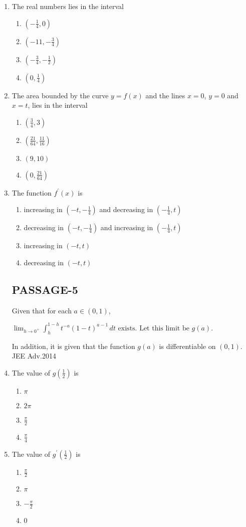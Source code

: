 \documentclass[journal,12pt,onecolumn]{IEEEtran}
\theoremstyle{remark}
\begin{document}
\begin{enumerate}
\item The real numbers lies in the interval
\begin{enumerate}
    \item $(-\frac{1}{4},0)$
    \item $(-11,-\frac{3}{4})$
    \item $(-\frac{3}{4},-\frac{1}{2})$
     \item $(0,\frac{1}{4})$
\end{enumerate}
\item The area bounded by the curve $y=f(x)$ and the lines $x=0$, $y=0$ 
 and $x=t$, lies in the interval
\begin{enumerate}
\item $(\frac{3}{4},3)$ 
\item $(\frac{21}{64},\frac{11}{16})$ 
\item $(9,10)$  
\item $(0,\frac{21}{64})$ 
\end{enumerate}
\item The function $f^{\prime}(x)$ is
\begin{enumerate}
    \item increasing in $(-t,-\frac{1}{4})$ and decreasing in $(-\frac{1}{4},t)$ 
    \item decreasing in $(-t,-\frac{1}{4})$ and increasing in $(-\frac{1}{4},t)$ 
    \item increasing in $(-t,t)$ 
    \item decreasing in $(-t,t)$
\end{enumerate}
\subsection{PASSAGE-5}

Given that for each $a \in (0, 1)$,

$\lim_{h \to 0^+} \int_h^{1-h} t^{-a} (1-t)^{a-1} \, dt \text{ exists. Let this limit be } g(a).$

In addition, it is given that the function $g(a)$ is differentiable on $(0, 1)$. 
\hfill{JEE Adv.2014} 
    \item The value of $g(\frac{1}{2})$ is
    \begin{enumerate}
        \item $\pi$
        \item $2\pi$
        \item $\frac{\pi}{2}$
        \item $\frac{\pi}{4}$
    \end{enumerate}
    \item The value of $g^{\prime}(\frac{1}{2})$ is
    \begin{enumerate}
        \item$\frac{\pi}{2}$
        \item${\pi} $
        \item $-\frac{\pi}{2}$
        \item 0
\end{enumerate}
\end{enumerate}
\end{document}
